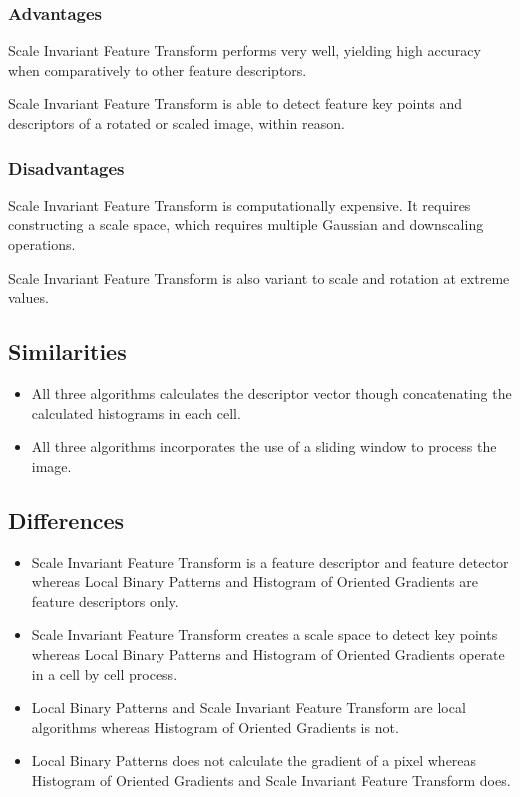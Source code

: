 \documentclass[conference]{IEEEtran}
\begin{document}
\subsubsection{Advantages}
Scale Invariant Feature Transform performs very well, yielding high accuracy
when comparatively to other feature descriptors.

Scale Invariant Feature Transform is able to detect feature key points and
descriptors of a rotated or scaled image, within reason.


\subsubsection{Disadvantages}
Scale Invariant Feature Transform is computationally expensive. It requires
constructing a scale space, which requires multiple Gaussian and downscaling
operations\cite{sift-1}.

Scale Invariant Feature Transform is also variant to scale and rotation at
extreme values.


\subsection{Similarities}
\begin{itemize}
    \item All three algorithms calculates the descriptor vector though
          concatenating the calculated histograms in each cell.

    \item All three algorithms incorporates the use of a sliding window to
          process the image.
\end{itemize}

\subsection{Differences}
\begin{itemize}
    \item Scale Invariant Feature Transform is a feature descriptor and feature
          detector whereas Local Binary Patterns and Histogram of Oriented
          Gradients are feature descriptors only.

    \item Scale Invariant Feature Transform creates a scale space to detect key
          points whereas Local Binary Patterns and Histogram of Oriented
          Gradients operate in a cell by cell process.

    \item Local Binary Patterns and Scale Invariant Feature Transform are local
          algorithms whereas Histogram of Oriented Gradients is not.

    \item Local Binary Patterns does not calculate the gradient of a pixel
          whereas Histogram of Oriented Gradients and Scale Invariant Feature
          Transform does.
\end{itemize}
\end{document}

